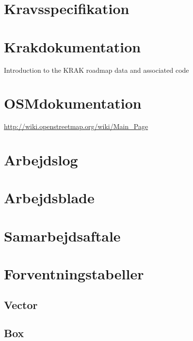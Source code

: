 \section{Kravsspecifikation}
\label{sec:Kravsspecifikation}


\label{sec:uml}


\section{Krakdokumentation}
\label{sec:Krakdokumentation1}
Introduction to the KRAK roadmap data and associated code


\label{sec:Krakdokumentation2}


\section{OSMdokumentation}
\url{http://wiki.openstreetmap.org/wiki/Main_Page}

\section{Arbejdslog}
\label{sec:Arbejdslog}


\section{Arbejdsblade}
\label{sec:Arbejdsblade}


\section{Samarbejdsaftale}
\label{sec:Samarbejdsaftale}



\section{Forventningstabeller}
\label{sec:forventningstabeller}
\subsection{Vector}

\clearpage
\subsection{Box}

\clearpage